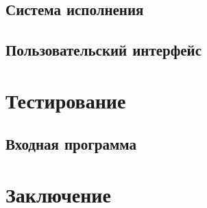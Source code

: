 \documentclass[12pt]{article}
\begin{document}
		\subsection{Система исполнения}
		\subsection{Пользовательский интерфейс}
	\section{Тестирование}
		\subsection{Входная программа}
	\newpage	
	\section{Заключение}
	\newpage
	\nocite{*}
			
	
	
	\newpage
	\tableofcontents %
\end{document}
